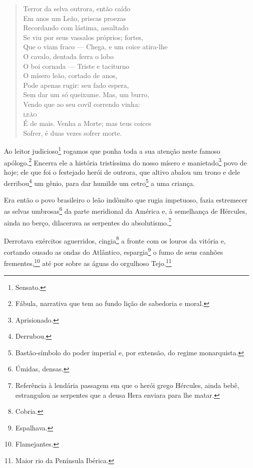 \begin{verse}
Terror da selva outrora, então caído\\
Em anos um Leão, priscas proezas\\
Recordando com lástima, assaltado\\
Se viu por seus vassalos próprios; fortes,\\
Que o viam fraco --- Chega, e um coice atira-lhe\\
O cavalo, dentada ferra o lobo\\
O boi cornada --- Triste e taciturno\\
O mísero leão, cortado de anos,\\
Pode apenas rugir: seu fado espera,\\
Sem dar um só queixume. Mas, um burro,\\
Vendo que ao seu covil correndo vinha:\\
\textsc{leão}\\
É de mais. Venha a Morte; mas teus coices\\
Sofrer, é duas vezes sofrer morte.
\end{verse}

\asterisc{}

Ao leitor judicioso\footnote{Sensato.} rogamos que ponha toda a sua
atenção neste famoso apólogo.\footnote{Fábula, narrativa que tem ao
  fundo lição de sabedoria e moral.} Encerra ele a história tristíssima
do nosso mísero e manietado\footnote{Aprisionado.} povo de hoje; ele
que foi o festejado herói de outrora, que altivo abalou um trono e dele
derribou\footnote{Derrubou.} um gênio, para dar humilde um
cetro\footnote{Bastão-símbolo do poder imperial e, por extensão,
  do regime monarquista.} a uma criança.

Era então o povo brasileiro o leão indômito que rugia impetuoso, fazia
estremecer as selvas umbrosas\footnote{Úmidas, densas.} da parte
meridional da América e, à semelhança de Hércules, ainda no berço,
dilacerava as serpentes do absolutismo.\footnote{Referência à lendária passagem
   em que o herói grego Hércules, ainda bebê, estrangulou as
  serpentes que a deusa Hera enviara para lhe matar.}

Derrotava exércitos aguerridos, cingia\footnote{Cobria.} a fronte com
os louros da vitória e, cortando ousado as ondas do Atlântico,
espargia\footnote{Espalhava.} o fumo de seus canhões
frementes,\footnote{Flamejantes.} até por sobre as águas do orgulhoso
Tejo.\footnote{Maior rio da Península Ibérica.}

